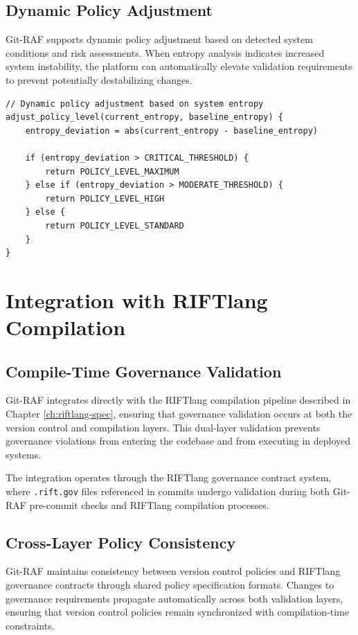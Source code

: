 \subsection{Dynamic Policy Adjustment}

Git-RAF supports dynamic policy adjustment based on detected system conditions and risk assessments. When entropy analysis indicates increased system instability, the platform can automatically elevate validation requirements to prevent potentially destabilizing changes.

\begin{lstlisting}[style=riftlang, language=rift]
// Dynamic policy adjustment based on system entropy
adjust_policy_level(current_entropy, baseline_entropy) {
    entropy_deviation = abs(current_entropy - baseline_entropy)
    
    if (entropy_deviation > CRITICAL_THRESHOLD) {
        return POLICY_LEVEL_MAXIMUM
    } else if (entropy_deviation > MODERATE_THRESHOLD) {
        return POLICY_LEVEL_HIGH  
    } else {
        return POLICY_LEVEL_STANDARD
    }
}
\end{lstlisting}

\section{Integration with RIFTlang Compilation}

\subsection{Compile-Time Governance Validation}

Git-RAF integrates directly with the RIFTlang compilation pipeline described in Chapter \ref{ch:riftlang-spec}, ensuring that governance validation occurs at both the version control and compilation layers. This dual-layer validation prevents governance violations from entering the codebase and from executing in deployed systems.

The integration operates through the RIFTlang governance contract system, where \texttt{.rift.gov} files referenced in commits undergo validation during both Git-RAF pre-commit checks and RIFTlang compilation processes.

\subsection{Cross-Layer Policy Consistency}

Git-RAF maintains consistency between version control policies and RIFTlang governance contracts through shared policy specification formats. Changes to governance requirements propagate automatically across both validation layers, ensuring that version control policies remain synchronized with compilation-time constraints.

